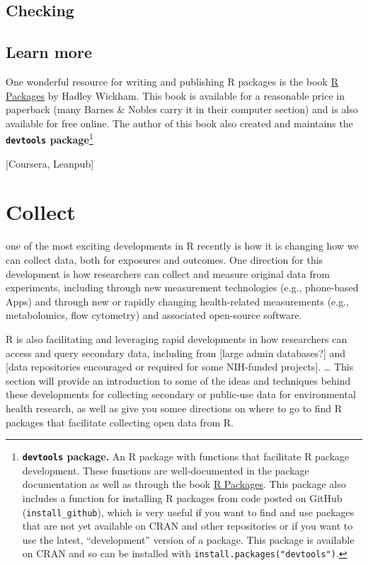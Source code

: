 \documentclass[]{tufte-book}
\begin{document}
\hypertarget{checking}{%
\section{Checking}\label{checking}}

\hypertarget{learn-more-2}{%
\section{Learn more}\label{learn-more-2}}

One wonderful resource for writing and publishing R packages is the book \href{http://r-pkgs.had.co.nz/}{R
Packages} by Hadley Wickham. This book is available
for a reasonable price in paperback (many Barnes \& Nobles carry it in their
computer section) and is also available for free online. The author of this book
also created and maintains the \textbf{\texttt{devtools} package}\footnote{\textbf{\texttt{devtools} package.}
  An R package with functions that facilitate R package development. These
  functions are well-documented in the package documentation as well as through
  the book \href{http://r-pkgs.had.co.nz/}{R Packages}. This package also includes a
  function for installing R packages from code posted on GitHub
  (\texttt{install\_github}), which is very useful if you want to find and use packages
  that are not yet available on CRAN and other repositories or if you want to use
  the latest, ``development'' version of a package. This package is available on
  CRAN and so can be installed with \texttt{install.packages("devtools")}.}

{[}Coursera, Leanpub{]}

\hypertarget{collect}{%
\chapter{Collect}\label{collect}}

 one of the most exciting
developments in R recently is how it is changing how we can collect data, both for
exposures and outcomes. One direction for this development is how researchers can
collect and measure original data from experiments, including through new measurement
technologies (e.g., phone-based Apps) and through new or rapidly changing health-related
measurements (e.g., metabolomics, flow cytometry) and associated open-source
software.

R is also facilitating and leveraging rapid developments in how researchers can access and
query secondary data, including from {[}large admin databases?{]} and {[}data repositories
encouraged or required for some NIH-funded projects{]}. \ldots{} This section will provide an
introduction to some of the ideas and techniques behind these developments for
collecting secondary or public-use data for environmental health research, as well as
give you somee directions on where to go to find R packages that facilitate collecting
open data from R.
\end{document}
